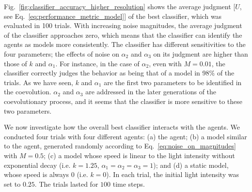 Fig.~\ref{fig:classifier_accuracy_higher_resolution} shows the average judgment [$U$, see Eq.~\ref{eq:performance_metric_model}] of the best classifier, which was evaluated in 100 trials. With increasing noise magnitudes, the average judgment of the classifier approaches zero, which means that the classifier can identify the agents as models more consistently. The classifier has different sensitivities to the four parameters; the effects of noise on $\alpha_2$ and $\alpha_3$ on its judgment are higher than those of $k$ and $\alpha_1$. For instance, in the case of $\alpha_2$, even with $M=0.01$, the classifier correctly judges the behavior as being that of a model in 98\% of the trials. As we have seen, $k$ and $\alpha_1$ are the first two parameters to be identified in the coevolution. $\alpha_2$ and $\alpha_3$ are addressed in the later generations of the coevolutionary process, and it seems that the classifier is more sensitive to these two parameters.

We now investigate how the overall best classifier interacts with the agents. We conducted four trials with four different agents: (a) the agent; (b) a model similar to the agent, generated randomly according to Eq.~\ref{eq:noise_on_magnitudes} with $M=0.5$; (c) a model whose speed is linear to the light intensity without exponential decay (i.e. $k=1.25$, $\alpha_1 = \alpha_2 = \alpha_3 = 1$); and (d) a static model, whose speed is always $0$ (i.e. $k=0$). In each trial, the initial light intensity was set to $0.25$. The trials lasted for $100$ time steps. 

